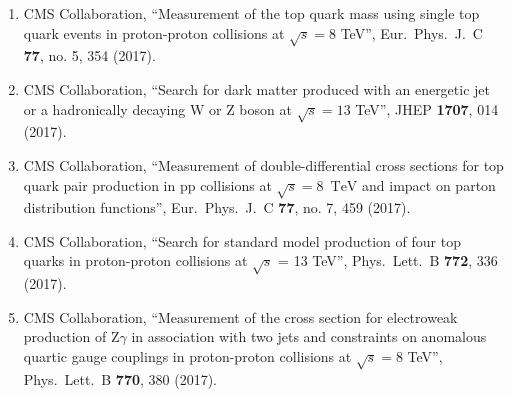 \begin{enumerate}
\item CMS Collaboration, ``Measurement of the top quark mass using single top quark events in proton-proton collisions at $\sqrt{s}= 8$  TeV'', Eur.\ Phys.\ J.\ C {\bf 77}, no. 5, 354 (2017).

\item CMS Collaboration, ``Search for dark matter produced with an energetic jet or a hadronically decaying W or Z boson at $ \sqrt{s}=13 $ TeV'', JHEP {\bf 1707}, 014 (2017).

\item CMS Collaboration, ``Measurement of double-differential cross sections for top quark pair production in pp collisions at $\sqrt{s} = 8$ $\,\text {TeV}$ and impact on parton distribution functions'', Eur.\ Phys.\ J.\ C {\bf 77}, no. 7, 459 (2017).

\item CMS Collaboration, ``Search for standard model production of four top quarks in proton-proton collisions at $\sqrt{s}$ = 13 TeV'', Phys.\ Lett.\ B {\bf 772}, 336 (2017).

\item CMS Collaboration, ``Measurement of the cross section for electroweak production of Z$\gamma$ in association with two jets and constraints on anomalous quartic gauge couplings in proton-proton collisions at $\sqrt{s} = 8$ TeV'', Phys.\ Lett.\ B {\bf 770}, 380 (2017).


\end{enumerate}

